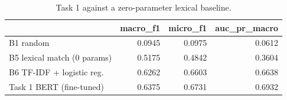 \begin{table}[t]
\caption{Task 1 against a zero-parameter lexical baseline.}
\label{tab:t1base}
\begin{tabular}{lrrr}
\toprule
 & macro\_f1 & micro\_f1 & auc\_pr\_macro \\
\midrule
B1 random & 0.0945 & 0.0975 & 0.0612 \\
B5 lexical match (0 params) & 0.5175 & 0.4842 & 0.3604 \\
B6 TF-IDF + logistic reg. & 0.6262 & 0.6603 & 0.6638 \\
Task 1 BERT (fine-tuned) & 0.6375 & 0.6731 & 0.6932 \\
\bottomrule
\end{tabular}
\end{table}
